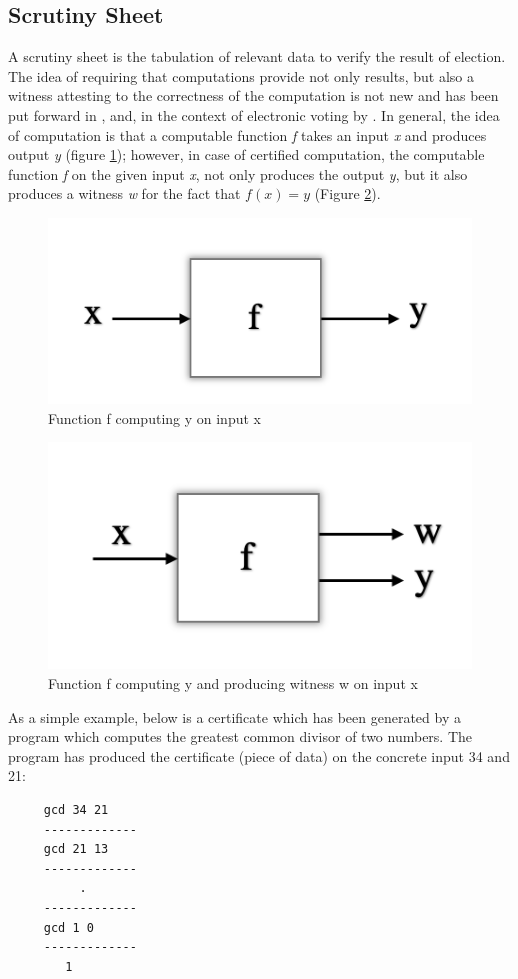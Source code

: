 		

  
	       
    
   \subsection{Scrutiny Sheet}
   \label{secback:scruntiny_sheet}
   A scrutiny sheet is the tabulation of relevant data to verify the result of election. 
   The idea of requiring that computations provide not only results, but also a witness attesting
    to the correctness of the computation is not new
	and has been put forward in \citep{89397}
	\citep{MCCONNELL2011119}
	\citep{Arkoudas:2005:DRC}, and, in the context of electronic voting by  \citep{Schurmann:2009:EET} \citep{Pattinson:2015:VCM}.
	 In general, the idea of computation is that a computable function \textit{f} takes 
	an input \textit{x} and produces output \textit{y} (figure \ref{fig:fnxy}); however, in case of
	 certified computation, 
	the computable function \textit{f} on the given input \textit{x}, not only produces the output \textit{y},
	but it also produces a witness \textit{w} for the fact that $ f (x) = y$ (Figure \ref{fig:fnxyw}).
	
	\begin{figure}[!h]
	\centering
  \includegraphics[width=0.5\linewidth]{figs/function_fx.png}
  \caption{Function f computing y on input x}
  \label{fig:fnxy}
  \end{figure} 
  
  \begin{figure}[!h]
  \centering
  \includegraphics[width=0.5\linewidth]{figs/funcxy.png}
  \caption{Function f computing y and producing witness w on input x}
  \label{fig:fnxyw}
  \end{figure} 


   \noindent 
    As a simple example, below is a certificate which has been generated by a program which computes the greatest common divisor 
    of two numbers. The program has produced the certificate (piece of data)
    on the concrete input 34 and 21:
    \begin{center}
  
   \begin{verbatim}
     gcd 34 21
     -------------
     gcd 21 13
     -------------
          .
     -------------
     gcd 1 0 
     -------------
        1
   \end{verbatim}
    \end{center}
   
